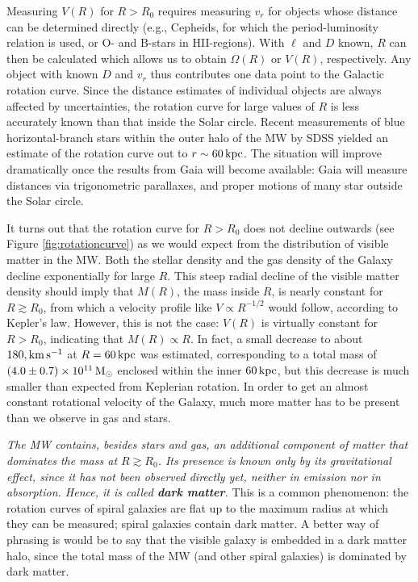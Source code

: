 \documentclass[a4paper,10pt]{article}
\begin{document}
{\noindent}Measuring $V(R)$ for $R>R_0$ requires measuring $v_r$ for objects whose distance can be determined directly (e.g., Cepheids, for which the period-luminosity relation is used, or O- and B-stars in HII-regions). With $\ell$ and $D$ known, $R$ can then be calculated which allows us to obtain $\Omega(R)$ or $V(R)$, respectively. Any object with known $D$ and $v_r$ thus contributes one data point to the Galactic rotation curve. Since the distance estimates of individual objects are always affected by uncertainties, the rotation curve for large values of $R$ is less accurately known than that inside the Solar circle. Recent measurements of blue horizontal-branch stars within the outer halo of the MW by SDSS yielded an estimate of the rotation curve out to $r\sim60\,{\rm kpc}$. The situation will improve dramatically once the results from Gaia will become available: Gaia will measure distances via trigonometric parallaxes, and proper motions of many star outside the Solar circle.

{\noindent}It turns out that the rotation curve for $R>R_0$ does not decline outwards (see Figure \ref{fig:rotationcurve}) as we would expect from the distribution of visible matter in the MW. Both the stellar density and the gas density of the Galaxy decline exponentially for large $R$. This steep radial decline of the visible matter density should imply that $M(R)$, the mass inside $R$, is nearly constant for $R\gtrsim R_0$, from which a velocity profile like $V\propto R^{-1/2}$ would follow, according to Kepler's law. However, this is not the case: $V(R)$ is virtually constant for $R>R_0$, indicating that $M(R)\propto R$. In fact, a small decrease to about $180,{\rm km\,s^{-1}}$ at $R=60\,{\rm kpc}$ was estimated, corresponding to a total mass of $(4.0\pm0.7)\times10^{11}\,{\rm M_\odot}$ enclosed within the inner $60\,{\rm kpc}$, but this decrease is much smaller than expected from Keplerian rotation. In order to get an almost constant rotational velocity of the Galaxy, much more matter has to be present than we observe in gas and stars.

{\noindent}\textit{The MW contains, besides stars and gas, an additional component of matter that dominates the mass at $R\gtrsim R_0$. Its presence is known only by its gravitational effect, since it has not been observed directly yet, neither in emission nor in absorption. Hence, it is called \textbf{dark matter}.} This is a common phenomenon: the rotation curves of spiral galaxies are flat up to the maximum radius at which they can be measured; spiral galaxies contain dark matter. A better way of phrasing is would be to say that the visible galaxy is embedded in a dark matter halo, since the total mass of the MW (and other spiral galaxies) is dominated by dark matter.
\end{document}
